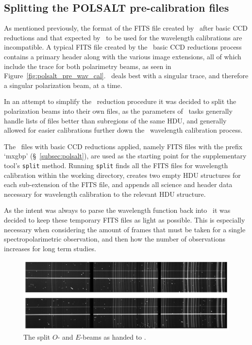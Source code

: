 \subsection{Splitting the POLSALT pre-calibration files}

As mentioned previously, the format of the \gls{FITS} file created by \polsalt\ after basic \gls{CCD} reductions and that expected by \iraf\ to be used for the wavelength calibrations are incompatible. A typical \gls{FITS} file created by the \polsalt\ basic \gls{CCD} reductions process contains a primary header along with the various image extensions, all of which include the trace for both polarimetry beams, as seen in Figure~\ref{fig:polsalt_pre_wav_cal}. \iraf\ deals best with a singular trace, and therefore a singular polarization beam, at a time.
\prgph

In an attempt to simplify the \iraf\ reduction procedure it was decided to split the polarization beams into their own files, as the parameters of \iraf\ tasks generally handle lists of files better than subregions of the same \gls{HDU}, and generally allowed for easier calibrations further down the \iraf\ wavelength calibration process.
\prgph

The \polsalt\ files with basic \gls{CCD} reductions applied, namely \gls{FITS} files with the prefix `mxgbp' (\S~\ref{subsec:polsalt}), are used as the starting point for the supplementary tool's \texttt{split} method. Running \texttt{split} finds all the \gls{FITS} files for wavelength calibration within the working directory, creates two empty \gls{HDU} structures for each sub-extension of the \gls{FITS} file, and appends all science and header data necessary for wavelength calibration to the relevant \gls{HDU} structure.
\prgph

As the intent was always to parse the wavelength function back into \polsalt\ it was decided to keep these temporary \gls{FITS} files as light as possible. This is especially necessary when considering the amount of frames that must be taken for a single spectropolarimetric observation, and then how the number of observations increases for long term studies.
\prgph

\begin{figure}[t]
    \centering
    \includegraphics[width = 1.0\textwidth]{figures/3_OEsplit.pdf}
    \caption{The split $O$- and $E$-beams as handed to \iraf.}
    \label{fig:OE_split}
\end{figure}

